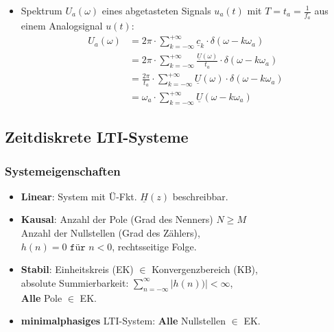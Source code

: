 \begin{itemize}
{	\textit{Abhilfe}: Eingangssignal auf $\omega_g$-Band begrenzen und\\ \textbf{Abtasttheorem} einhalten, Verringerung von $t_a$.}
\normalsize
\begin{gather*}
	\boxed{\omega_a \ge 2 \omega_g} \text{ bzw. } f_a \ge 2 f_g\\
	\boxed{\omega_g \le \frac{\omega_a}{2}} = \frac{1}{2} \cdot \frac{2\pi}{t_a} \text{ bzw. } f_g \ge \frac{f_a}{2}
\end{gather*}
{\footnotesize Merke: zeitbegrenztes Signal: $\infty$ langes Spektrum $\rightarrow$ Aliasing\\
Dirac-Sprung im Signal $\infty$ hohe $f$ im Spektrum $\rightarrow$ Aliasing}

\item Spektrum $U_a(\omega)$ eines abgetasteten Signals $u_a(t)$ mit $T=t_a = \frac{1}{f_a}$ aus einem Analogsignal $u(t)$:
\begin{align*}
U_a(\omega) &= 2\pi \cdot \sum_{k=-\infty}^{+\infty} \underline{c}_k \cdot \delta(\omega-k\omega_a)\\
& = 2\pi \cdot \sum_{k=-\infty}^{+\infty} \frac{\underline{U}(\omega)}{t_a} \cdot \delta(\omega-k\omega_a)\\
&= \frac{2\pi}{t_a} \cdot \sum_{k=-\infty}^{+\infty} \underline{U}(\omega) \cdot \delta(\omega-k\omega_a) \\
& =  \omega_a \cdot \sum_{k=-\infty}^{+\infty} \underline{U}(\omega-k\omega_a)
\end{align*}

\end{itemize}
\clearpage
\vspace{-1.5em}
\subsection{Zeitdiskrete LTI-Systeme}
\subsubsection{Systemeigenschaften}
\begin{itemize}
	\item \textbf{Linear}: System mit Ü-Fkt. $\underline{H}(z)$ beschreibbar.
	\item \textbf{Kausal}:
	      Anzahl der Pole (Grad des Nenners)  $N\ge M$\\
	      Anzahl der Nullstellen (Grad des Zählers),\\
	      $ h(n) = 0 \texttt{ für } n<0 $, rechtsseitige Folge.
	\item \textbf{Stabil}:
	      Einheitskreis (EK) $\in$ Konvergenzbereich (KB),\\
	   absolute Summierbarkeit: $ \sum_{n=-\infty}^{\infty}|h(n))| < \infty $,\\
	   \textbf{Alle} Pole $\in$ EK.
	\item \textbf{minimalphasiges} LTI-System: \textbf{Alle} Nullstellen $\in$ EK.
\end{itemize}


